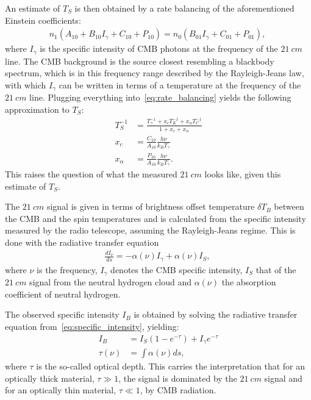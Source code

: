 An estimate of $T_S$ is then obtained by a rate balancing of the aforementioned Einstein coefficients:
\begin{align}
    n_1 (A_{10} + B_{10}I_\gamma +C_{10}+P_{10})=n_0(B_{01}I_\gamma + C_{01}+P_{01}),~\label{eq:rate_balancing}
\end{align}
where $I_\gamma$ is the specific intensity of CMB photons at the frequency of the $21~\si{cm}$ line. The CMB background is the source closest resembling a blackbody spectrum, which is in this frequency range described by the Rayleigh-Jeans law, with which $I_\gamma$ can be written in terms of a temperature at the frequency of the $21~\si{cm}$ line. Plugging everything into~\ref{eq:rate_balancing} yields the following approximation to $T_S$:
\begin{align}
    T_S^{-1} &= \frac{T_\gamma^{-1} + x_c T_K^{-1} + x_\alpha T_C^{-1}}{1+x_c+x_\alpha}\\
    x_c &= \frac{C_{10}}{A_{10}}\frac{h\nu}{k_B T_\gamma}\\
    x_\alpha &= \frac{P_{10}}{A_{10}}\frac{h\nu}{k_B T_\gamma}.
\end{align}
This raises the question of what the measured $21~\si{cm}$ looks like, given this estimate of $T_S$. 

The $21~\si{cm}$ signal is given in terms of brightness offset temperature $\delta T_B$ between the CMB and the spin temperatures and is calculated from the specific intensity measured by the radio telescope, assuming the Rayleigh-Jeans regime. This is done with the radiative transfer equation
\begin{align}
    \frac{dI_\nu}{ds} = -\alpha(\nu) I_\gamma + \alpha(\nu) I_S,~\label{eq:specific_intensity}
\end{align}
where $\nu$ is the frequency, $I_\gamma$ denotes the CMB specific intensity, $I_S$ that of the $21~\si{cm}$ signal from the neutral hydrogen cloud and $\alpha(\nu)$ the absorption coefficient of neutral hydrogen.

The observed specific intensity $I_B$ is obtained by solving the radiative transfer equation from~\ref{eq:specific_intensity}, yielding:
\begin{align}
    I_B &= I_S (1-e^{-\tau})+I_\gamma e^{-\tau}\\
    \tau(\nu) &= \int \alpha(\nu) ds,
\end{align}
where $\tau$ is the so-called optical depth. This carries the interpretation that for an optically thick material, $\tau \gg 1$, the signal is dominated by the $21~\si{cm}$ signal and for an optically thin material,  $\tau \ll 1$, by CMB radiation. 

